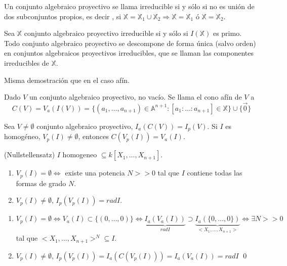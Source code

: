 \begin{Def}
Un conjunto algebraico proyectivo se llama irreducible si y sólo si no es unión de dos subconjuntos propios, es decir , si $\mathbb{X}=\mathbb{X}_1\cup \mathbb{X}_2 \Rightarrow \mathbb{X}=\mathbb{X}_1$ ó $\mathbb{X}=\mathbb{X}_2$. 
\end{Def}

\begin{Prop}
Sea $\mathbb{X}$ conjunto algebraico proyectivo irreducible si y sólo si $I(\mathbb{X})$ es primo. Todo conjunto algebraico proyectivo se descompone de forma única (salvo orden) en conjuntos algebraicos proyectivos irreducibles, que se llaman las componentes irreducibles de $\mathbb{X}$. 
\end{Prop}

\begin{Dem}
Misma demostración que en el caso afín. 
\end{Dem}

\begin{Def}
Dado $V$ un conjunto algebraico proyectivo, no vacío. Se llama el cono afín de $V$ a 
 $$C(V)=V_a(I(V)) = \{ (a_1,\dots , a_{n+1}) \in \mathbb{A}^{n+1} : [a_1:\dots : a_{n+1}]\in \mathbb{X}\} \cup \{ \vec{0} \} $$

\end{Def}

\begin{Prop}
Sea $V\neq \emptyset$ conjunto algebraico proyectivo, $I_a(C(V))=I_p(V)$. Si $I$ es homogéneo, $V_p(I)\neq \emptyset$, entonces $C(V_p(I))=V_a(I)$. 
\end{Prop}

\begin{Teo}
(Nullstellensatz) $I$ homogeneo $\subseteq k[X_1,\dots ,X_{n+1}]$.
\begin{enumerate}
\item $V_p(I)=\emptyset \Leftrightarrow $ existe una potencia $N>>0$ tal que $I$ contiene todas las formas de grado $N$.
\item $V_p(I)\neq \emptyset$, $I_p(V_p(I))= rad I$.
\end{enumerate}
\end{Teo}

\begin{Dem}
\begin{enumerate}
\item $V_p(I)=\emptyset \Leftrightarrow V_a(I)\subset \{(0,\dots ,0)\} \Leftrightarrow  \underbrace{I_a(V_a(I))}_{rad I}\supset \underbrace{I_a(\{ 0, \dots , 0 \})}_{<X_1,\dots , X_{n+1}>} \Leftrightarrow 
\exists N >> 0 $ tal que $<X_1,\dots , X_{n+1}>^N\subseteq I$. 

\item $V_p(I) \neq \emptyset$, $I_p(V_p(I))=I_a(C(V_p(I))) = I_a(V_a(I)) = rad I$ \qed
\end{enumerate}
\end{Dem}

